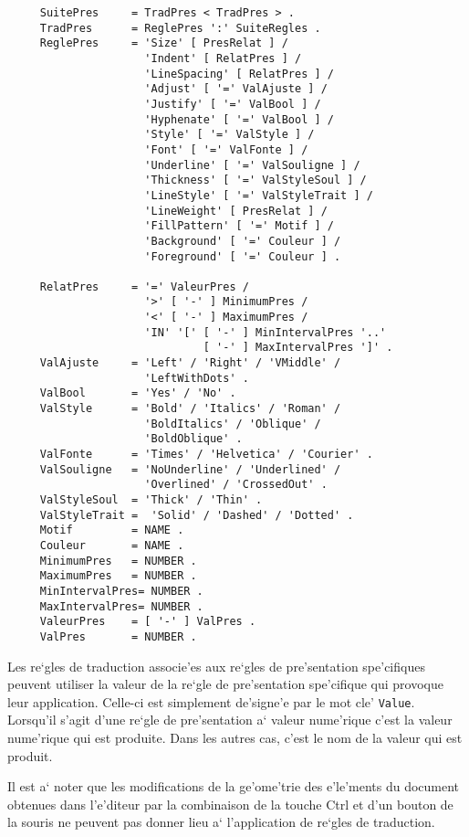 {\begin{verbatim}
     SuitePres     = TradPres < TradPres > .
     TradPres      = ReglePres ':' SuiteRegles .
     ReglePres     = 'Size' [ PresRelat ] /
                     'Indent' [ RelatPres ] /
                     'LineSpacing' [ RelatPres ] /
                     'Adjust' [ '=' ValAjuste ] /
                     'Justify' [ '=' ValBool ] /
                     'Hyphenate' [ '=' ValBool ] /
                     'Style' [ '=' ValStyle ] /
                     'Font' [ '=' ValFonte ] /
                     'Underline' [ '=' ValSouligne ] /
                     'Thickness' [ '=' ValStyleSoul ] /
                     'LineStyle' [ '=' ValStyleTrait ] /
                     'LineWeight' [ PresRelat ] /
                     'FillPattern' [ '=' Motif ] /
                     'Background' [ '=' Couleur ] /
                     'Foreground' [ '=' Couleur ] .

     RelatPres     = '=' ValeurPres /
                     '>' [ '-' ] MinimumPres /
                     '<' [ '-' ] MaximumPres /
                     'IN' '[' [ '-' ] MinIntervalPres '..'
                              [ '-' ] MaxIntervalPres ']' .
     ValAjuste     = 'Left' / 'Right' / 'VMiddle' / 
                     'LeftWithDots' .
     ValBool       = 'Yes' / 'No' .
     ValStyle      = 'Bold' / 'Italics' / 'Roman' /
                     'BoldItalics' / 'Oblique' /
                     'BoldOblique' .
     ValFonte      = 'Times' / 'Helvetica' / 'Courier' .
     ValSouligne   = 'NoUnderline' / 'Underlined' /
                     'Overlined' / 'CrossedOut' .
     ValStyleSoul  = 'Thick' / 'Thin' .
     ValStyleTrait =  'Solid' / 'Dashed' / 'Dotted' .
     Motif         = NAME .
     Couleur       = NAME .
     MinimumPres   = NUMBER .
     MaximumPres   = NUMBER .
     MinIntervalPres= NUMBER .
     MaxIntervalPres= NUMBER .
     ValeurPres    = [ '-' ] ValPres .
     ValPres       = NUMBER .
\end{verbatim}

\label{valpres}
Les re`gles de traduction associe'es aux re`gles de pre'sentation spe'cifiques
peuvent utiliser la valeur de la re`gle de pre'sentation spe'cifique qui
provoque leur application. Celle-ci est simplement de'signe'e par le mot cle'
{\tt Value}. Lorsqu'il s'agit d'une re`gle de pre'sentation a` valeur
nume'rique c'est la valeur nume'rique qui est produite. Dans les autres cas,
c'est le nom de la valeur qui est produit.

Il est a` noter que les modifications de la ge'ome'trie des e'le'ments du
document obtenues dans l'e'diteur par la combinaison de la touche Ctrl et
d'un bouton de la souris ne peuvent pas
donner lieu a` l'application de re`gles de traduction.

}
